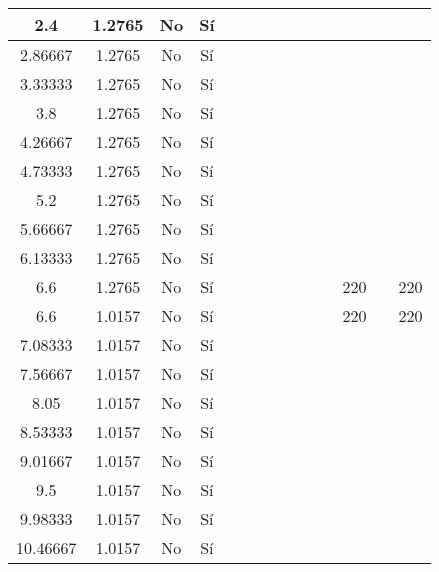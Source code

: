 \begin{table}[H]
{\begin{tabular}{|c|c|c|c|c|c|c|c|c|c|c|c|c|c|}
\hline
2.4 & 1.2765 & No  & Sí  &     &     &     &     &     &     &     &     &     &  \bigstrut\\
\hline
2.86667 & 1.2765 & No  & Sí  &     &     &     &     &     &     &     &     &     &  \bigstrut\\
\hline
3.33333 & 1.2765 & No  & Sí  &     &     &     &     &     &     &     &     &     &  \bigstrut\\
\hline
3.8 & 1.2765 & No  & Sí  &     &     &     &     &     &     &     &     &     &  \bigstrut\\
\hline
4.26667 & 1.2765 & No  & Sí  &     &     &     &     &     &     &     &     &     &  \bigstrut\\
\hline
4.73333 & 1.2765 & No  & Sí  &     &     &     &     &     &     &     &     &     &  \bigstrut\\
\hline
5.2 & 1.2765 & No  & Sí  &     &     &     &     &     &     &     &     &     &  \bigstrut\\
\hline
5.66667 & 1.2765 & No  & Sí  &     &     &     &     &     &     &     &     &     &  \bigstrut\\
\hline
6.13333 & 1.2765 & No  & Sí  &     &     &     &     &     &     &     &     &     &  \bigstrut\\
\hline
6.6 & 1.2765 & No  & Sí  &     &     &     &     &     &     &     & 220 &     & 220 \bigstrut\\
\hline
6.6 & 1.0157 & No  & Sí  &     &     &     &     &     &     &     & 220 &     & 220 \bigstrut\\
\hline
7.08333 & 1.0157 & No  & Sí  &     &     &     &     &     &     &     &     &     &  \bigstrut\\
\hline
7.56667 & 1.0157 & No  & Sí  &     &     &     &     &     &     &     &     &     &  \bigstrut\\
\hline
8.05 & 1.0157 & No  & Sí  &     &     &     &     &     &     &     &     &     &  \bigstrut\\
\hline
8.53333 & 1.0157 & No  & Sí  &     &     &     &     &     &     &     &     &     &  \bigstrut\\
\hline
9.01667 & 1.0157 & No  & Sí  &     &     &     &     &     &     &     &     &     &  \bigstrut\\
\hline
9.5 & 1.0157 & No  & Sí  &     &     &     &     &     &     &     &     &     &  \bigstrut\\
\hline
9.98333 & 1.0157 & No  & Sí  &     &     &     &     &     &     &     &     &     &  \bigstrut\\
\hline
10.46667 & 1.0157 & No  & Sí  &     &     &     &     &     &     &     &     &     &  \bigstrut\\

\end{tabular}}
\end{table}
